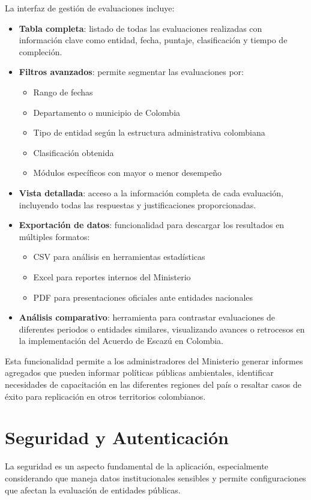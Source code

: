 \documentclass[12pt,a4paper]{report}
\begin{document}
La interfaz de gestión de evaluaciones incluye:
\begin{itemize}[leftmargin=*]
    \item \textbf{Tabla completa}: listado de todas las evaluaciones realizadas con información clave como entidad, fecha, puntaje, clasificación y tiempo de compleción.
    \item \textbf{Filtros avanzados}: permite segmentar las evaluaciones por:
    \begin{itemize}
        \item Rango de fechas
        \item Departamento o municipio de Colombia
        \item Tipo de entidad según la estructura administrativa colombiana
        \item Clasificación obtenida
        \item Módulos específicos con mayor o menor desempeño
    \end{itemize}
    \item \textbf{Vista detallada}: acceso a la información completa de cada evaluación, incluyendo todas las respuestas y justificaciones proporcionadas.
    \item \textbf{Exportación de datos}: funcionalidad para descargar los resultados en múltiples formatos:
    \begin{itemize}
        \item CSV para análisis en herramientas estadísticas
        \item Excel para reportes internos del Ministerio
        \item PDF para presentaciones oficiales ante entidades nacionales
    \end{itemize}
    \item \textbf{Análisis comparativo}: herramienta para contrastar evaluaciones de diferentes periodos o entidades similares, visualizando avances o retrocesos en la implementación del Acuerdo de Escazú en Colombia.
\end{itemize}

Esta funcionalidad permite a los administradores del Ministerio generar informes agregados que pueden informar políticas públicas ambientales, identificar necesidades de capacitación en las diferentes regiones del país o resaltar casos de éxito para replicación en otros territorios colombianos.

\chapter{Seguridad y Autenticación}
La seguridad es un aspecto fundamental de la aplicación, especialmente considerando que maneja datos institucionales sensibles y permite configuraciones que afectan la evaluación de entidades públicas.
\end{document}
